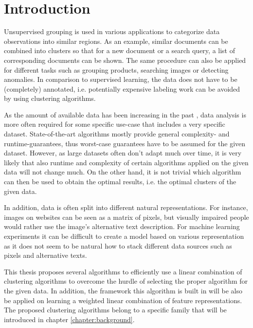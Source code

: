\chapter{Introduction}


Unsupervised grouping is used in various applications to categorize data observations into similar regions. As an example, similar documents can be combined into clusters so that for a new document or a search query, a list of corresponding documents can be shown. The same procedure can also be applied for different tasks such as grouping products, searching images or detecting anomalies. In comparison to supervised learning, the data does not have to be (completely) annotated, i.e. potentially expensive labeling work can be avoided by using clustering algorithms.

As the amount of available data has been increasing in the past \cite{wamba2015big}, data analysis is more often required for some specific use-case that includes a very specific dataset. State-of-the-art algorithms mostly provide general complexity- and runtime-guarantees, thus worst-case guarantees have to be assumed for the given dataset. However, as large datasets often don't adapt much over time, it is very likely that also runtime and complexity of certain algorithms applied on the given data will not change much. On the other hand, it is not trivial which algorithm can then be used to obtain the optimal results, i.e. the optimal clusters of the given data.

In addition, data is often split into different natural representations. For instance, images on websites can be seen as a matrix of pixels, but visually impaired people would rather use the image's alternative text description. For machine learning experiments it can be difficult to create a model based on various representation as it does not seem to be natural how to stack different data sources such as pixels and alternative texts.

This thesis proposes several algorithms to efficiently use a linear combination of clustering algorithms to overcome the hurdle of selecting the proper algorithm for the given data. In addition, the framework this algorithm is built in will be also be applied on learning a weighted linear combination of feature representations. The proposed clustering algorithms belong to a specific family that will be introduced in chapter \ref{chapter:background}.